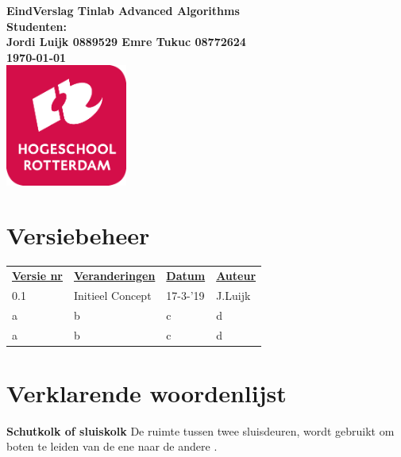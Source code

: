 \documentclass{article}
\begin{document}
\sffamily



\begin{titlepage}
  \centering
    \vfill
    {\bfseries\Huge
      EindVerslag Tinlab Advanced Algorithms \\
        \vskip2cm
      }
      {\bfseries\Large
        Studenten:\\
      }
      {
        \bfseries\normalsize
        Jordi Luijk 0889529 \newline
        Emre Tukuc 08772624 \newline\\
        \vskip1cm
        \today\\
    }    
    \vfill
    \includegraphics[width=4cm]{logohr.png} %
    \vfill
    \vfill
\end{titlepage}
\newpage
\tableofcontents

\newpage
\section{Versiebeheer}

\begin{table}[htp]
\begin{tabular}{llll}
\rowcolor[HTML]{FFD700} 
{\ul \textbf{Versie nr}} & {\ul \textbf{Veranderingen}} & {\ul \textbf{Datum}} & {\ul \textbf{Auteur}} \\
0.1 & Initieel Concept & 17-3-'19 & J.Luijk \\     
a & b & c & d \\     
a & b & c & d   
\end{tabular}
\end{table}
\newpage

\section{Verklarende woordenlijst}
\textbf{Schutkolk of sluiskolk} \newline
De ruimte tussen twee sluisdeuren, wordt gebruikt om boten te leiden van de ene naar de andere \cite{definitionschutkolk}.
\newpage
\end{document}
